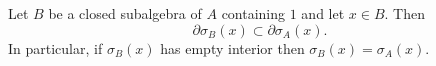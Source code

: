 Let $B$ be a closed subalgebra of $A$ containing $1$ and let $x \in B$. Then
$$\partial \sigma_B(x) \subset \partial \sigma_A(x).$$
In particular, if $\sigma_B(x)$ has empty interior then $\sigma_B(x) = \sigma_A(x)$.
